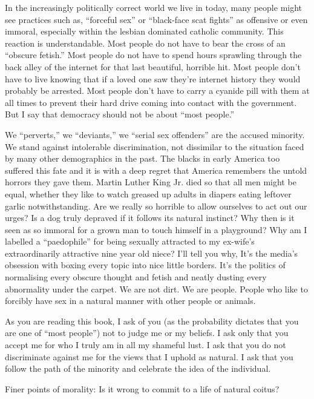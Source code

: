  
In the increasingly politically correct world we live in today, many people 
might see practices such as, “forceful sex” or “black-face scat fights” as 
offensive or even immoral, especially within the lesbian dominated catholic 
community. This reaction is understandable. Most people do not have to bear the 
cross of an “obscure fetish.” Most people do not have to spend hours sprawling 
through the back alley of the internet for that last beautiful, horrible hit. 
Most people don’t have to live knowing that if a loved one saw they’re internet 
history they would probably be arrested. Most people don’t have to carry a 
cyanide pill with them at all times to prevent their hard drive coming into 
contact with the government. But I say that democracy should not be about “most 
people.”


We “perverts,” we “deviants,” we “serial sex offenders” are the accused 
minority. We stand against intolerable discrimination, not dissimilar to the 
situation faced by many other demographics in the past. The blacks in early 
America too suffered this fate and it is with a deep regret that America 
remembers the untold horrors they gave them. Martin Luther King Jr. died so that 
all men might be equal, whether they like to watch greased up adults in diapers 
eating leftover garlic notwithstanding. Are we really so horrible to allow 
ourselves to act out our urges? Is a dog truly depraved if it follows its 
natural instinct? Why then is it seen as so immoral for a grown man to touch 
himself in a playground? Why am I labelled a “paedophile” for being sexually 
attracted to my ex-wife’s extraordinarily attractive nine year old niece? I’ll 
tell you why, It’s the media’s obsession with boxing every topic into nice 
little borders. It’s the politics of normalising every obscure thought and 
fetish and neatly dusting every abnormality under the carpet. We are not dirt. 
We are people. People who like to forcibly have sex in a natural manner with 
other people or animals.


As you are reading this book, I ask of you (as the probability dictates that you 
are one of “most people”) not to judge me or my beliefs. I ask only that you 
accept me for who I truly am in all my shameful lust. I ask that you do not 
discriminate against me for the views that I uphold as natural. I ask that you 
follow the path of the minority and celebrate the idea of the individual.


Finer points of morality: Is it wrong to commit to a life of natural coitus?


